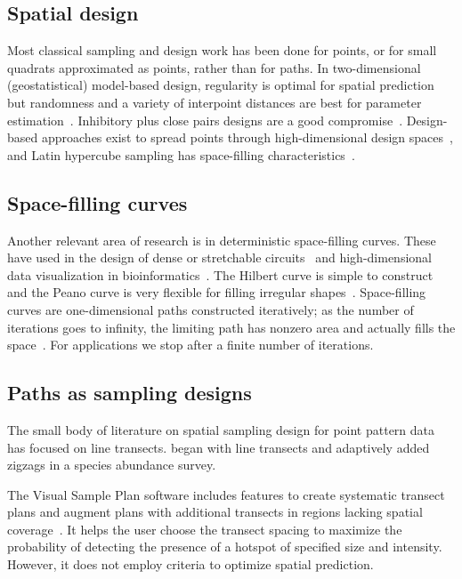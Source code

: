 \documentclass[review]{elsarticle}
\begin{document}
\subsection{Spatial design}

Most classical sampling and design work has been done for points, or for small
quadrats approximated as points, rather than for paths. In two-dimensional
(geostatistical) model-based design, regularity is optimal for spatial
prediction but randomness and a variety of interpoint distances are best for
parameter estimation~\citep{diggle}. Inhibitory plus close pairs designs are a
good compromise~\citep{chipetaetal2017}. Design-based approaches exist to
spread points through high-dimensional design spaces~\citep{borkowskipiepel},
and Latin hypercube sampling has space-filling
characteristics~\citep{mckayetal,husslageetal}.


\subsection{Space-filling curves}

Another relevant area of research is in deterministic space-filling curves.
These have used in the design of dense or stretchable
circuits~\citep{ogorzalek,mazhang} and high-dimensional data visualization
in bioinformatics~\citep{hilbertvis}. The Hilbert curve is simple to construct
and the Peano curve is very flexible for filling irregular
shapes~\citep{fanetal}. Space-filling curves are one-dimensional paths
constructed iteratively; as the number of iterations goes to infinity, the
limiting path has nonzero area and actually fills the space~\citep{sagan}. For
applications we stop after a finite number of iterations.


\subsection{Paths as sampling designs}

The small body of literature on spatial sampling design for point pattern
data has focused on line transects. \citet{pollard} began with line transects
and adaptively added zigzags in a species abundance survey.

The Visual Sample Plan software includes features to create systematic transect
plans and augment plans with additional transects in regions lacking spatial
coverage~\citep{vspguide}. It helps the user choose the transect spacing to
maximize the probability of detecting the presence of a hotspot of specified
size and intensity. However, it does not employ criteria to optimize spatial
prediction.
\end{document}
